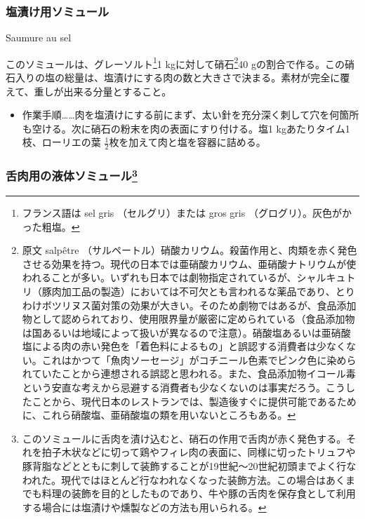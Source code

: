 \begin{recette}

\hypertarget{saumure-au-sel}{%
\subsubsection{塩漬け用ソミュール}\label{saumure-au-sel}}

\begin{frsubenv}

Saumure au sel

\end{frsubenv}


このソミュールは、グレーソルト\footnote{フランス語は sel gris
  （セルグリ）または gros gris （グログリ）。灰色がかった粗塩。}1
kgに対して硝石\footnote{原文 salpêtre
  （サルペートル）硝酸カリウム。殺菌作用と、肉類を赤く発色させる効果を持つ。現代の日本では亜硝酸カリウム、亜硝酸ナトリウムが使われることが多い。いずれも日本では劇物指定されているが、シャルキュトリ（豚肉加工品の製造）においては不可欠とも言われるな薬品であり、とりわけボツリヌス菌対策の効果が大きい。そのため劇物ではあるが、食品添加物として認められており、使用限界量が厳密に定められている（食品添加物は国あるいは地域によって扱いが異なるので注意）。硝酸塩あるいは亜硝酸塩による肉の赤い発色を「着色料によるもの」と誤認する消費者は少なくない。これはかつて「魚肉ソーセージ」がコチニール色素でピンク色に染められていたことから連想される誤認と思われる。また、食品添加物イコール毒という安直な考えから忌避する消費者も少なくないのは事実だろう。こうしたことから、現代日本のレストランでは、製造後すぐに提供可能であるために、これら硝酸塩、亜硝酸塩の類を用いないところもある。}40
gの割合で作る。この硝石入りの塩の総量は、塩漬けにする肉の数と大きさで決まる。素材が完全に覆えて、重しが出来る分量とすること。

\begin{itemize}
\tightlist
\item
  作業手順\ldots{}\ldots{}肉を塩漬けにする前にまず、太い針を充分深く刺して穴を何箇所も空ける。次に硝石の粉末を肉の表面にすり付ける。塩1
  kgあたりタイム1枝、ローリエの葉
  \(\frac{1}{2}\)枚を加えて肉と塩を容器に詰める。
\end{itemize}

\atoaki{}

\hypertarget{saumure-liquide-pour-langues}{%
\subsubsection[舌肉用の液体ソミュール]{\texorpdfstring{舌肉用の液体ソミュール\footnote{このソミュールに舌肉を漬け込むと、硝石の作用で舌肉が赤く発色する。それを拍子木状などに切って鶏やフィレ肉の表面に、同様に切ったトリュフや豚背脂などとともに刺して装飾することが19世紀〜20世紀初頭までよく行なわれた。現代ではほとんど行なわれなくなった装飾方法。この場合はあくまでも料理の装飾を目的としたものであり、牛や豚の舌肉を保存食として利用する場合には塩漬けや燻製などの方法も用いられる。}}{舌肉用の液体ソミュール}}\label{saumure-liquide-pour-langues}}


\end{recette}
